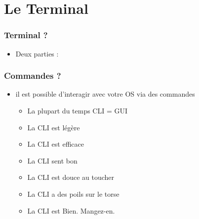 \section{Le Terminal} 
\begin{frame}
        \frametitle{Terminal ?}
	\begin{itemize}
	    \item Deux parties :
	\end{itemize}
\end{frame}
\begin{frame}
    \frametitle{Commandes ?}
    \begin{itemize}
        \item il est possible d'interagir avec votre OS via des commandes
            \begin{itemize}
                \item La plupart du temps CLI = GUI
                \item La CLI est légère
                \item La CLI est efficace
                \item La CLI sent bon
                \item La CLI est douce au toucher
                \item La CLI a des poils sur le torse
                \item La CLI est Bien. Mangez-en.
            \end{itemize}
    \end{itemize}
\end{frame}
